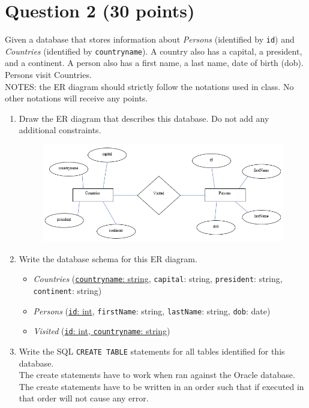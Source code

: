 \documentclass[letterpaper, 11pt]{article}
\begin{document}
\section*{Question 2 (30 points)}

Given a database that stores information about \textit{Persons} (identified by \texttt{id}) and \textit{Countries} (identified by \texttt{countryname}). A country also has a capital, a president, and a continent. A person also has a first name, a last name, date of birth (dob). Persons visit Countries.\\
NOTES: the ER diagram should strictly follow the notations used in class. No other notations will receive any points.

\begin{enumerate}[label={\alph*})]
    \item Draw the ER diagram that describes this database. Do not add any additional constraints.
    \begin{figure}[H]
        \centering
        \includegraphics[scale=0.7]{hw2-2a.png}
    \end{figure}
    \item Write the database schema for this ER diagram.

    \begin{itemize}
        \item \textit{Countries} (\ul{\texttt{countryname}: string}, \texttt{capital}: string, \texttt{president}: string, \texttt{continent}: string)
        \item \textit{Persons} (\ul{\texttt{id}: int}, \texttt{firstName}: string, \texttt{lastName}: string, \texttt{dob}: date)
        \item \textit{Visited} (\ul{\texttt{id}: int, \texttt{countryname}: string})
    \end{itemize}
    
    \item Write the SQL \texttt{CREATE TABLE} statements for all tables identified for this database.\\
    The create statements have to work when ran against the Oracle database.\\
    The create statements have to be written in an order such that if executed in that order will not cause any error.


\end{enumerate}
\end{document}
